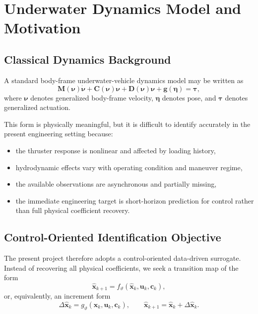 \section{Underwater Dynamics Model and Motivation}

\subsection{Classical Dynamics Background}

A standard body-frame underwater-vehicle dynamics model may be written as
\begin{equation}
\mathbf{M}(\boldsymbol{\nu})\dot{\boldsymbol{\nu}}
+
\mathbf{C}(\boldsymbol{\nu})\boldsymbol{\nu}
+
\mathbf{D}(\boldsymbol{\nu})\boldsymbol{\nu}
+
\mathbf{g}(\boldsymbol{\eta})
=
\boldsymbol{\tau},
\end{equation}
where $\boldsymbol{\nu}$ denotes generalized body-frame velocity, $\boldsymbol{\eta}$ denotes pose, and $\boldsymbol{\tau}$ denotes generalized actuation.

This form is physically meaningful, but it is difficult to identify accurately in the present engineering setting because:
\begin{itemize}
  \item the thruster response is nonlinear and affected by loading history,
  \item hydrodynamic effects vary with operating condition and maneuver regime,
  \item the available observations are asynchronous and partially missing,
  \item the immediate engineering target is short-horizon prediction for control rather than full physical coefficient recovery.
\end{itemize}

\subsection{Control-Oriented Identification Objective}

The present project therefore adopts a control-oriented data-driven surrogate.
Instead of recovering all physical coefficients, we seek a transition map of the form
\begin{equation}
\hat{\mathbf{x}}_{k+1}
=
f_{\vartheta}\!\left(\hat{\mathbf{x}}_{k}, \mathbf{u}_{k}, \mathbf{c}_{k}\right),
\end{equation}
or, equivalently, an increment form
\begin{equation}
\Delta \hat{\mathbf{x}}_{k}
=
g_{\vartheta}\!\left(\hat{\mathbf{x}}_{k}, \mathbf{u}_{k}, \mathbf{c}_{k}\right),
\qquad
\hat{\mathbf{x}}_{k+1} = \hat{\mathbf{x}}_{k} + \Delta \hat{\mathbf{x}}_{k}.
\end{equation}

